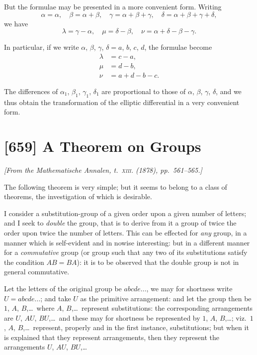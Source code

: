 \documentclass[11pt,a4paper]{article}
\theoremstyle{plain}
\theoremstyle{definition}
\begin{document}
But the formulae may be presented in a more convenient form. Writing
\[
\alpha = \alpha, \quad \beta = \alpha + \beta, \quad \gamma = \alpha + \beta + \gamma, \quad \delta = \alpha + \beta + \gamma + \delta,
\]
we have
\[
\lambda = \gamma - \alpha, \quad \mu = \delta - \beta, \quad \nu = \alpha + \delta - \beta - \gamma.
\]

In particular, if we write $\alpha$, $\beta$, $\gamma$, $\delta = a$, $b$, $c$, $d$, the formulae become
\begin{align*}
\lambda &= c - a, \\
\mu &= d - b, \\
\nu &= a + d - b - c.
\end{align*}

The differences of $\alpha_1$, $\beta_1$, $\gamma_1$, $\delta_1$ are proportional to those of $\alpha$, $\beta$, $\gamma$, $\delta$, and we thus obtain the transformation of the elliptic differential in a very convenient form.

\newpage
\section{[659] A Theorem on Groups}
\label{sec:659}

\noindent\textit{[From the \emph{Mathematische Annalen}, t.~\textsc{xiii}. (1878), pp.~561--565.]}

\medskip

The following theorem is very simple; but it seems to belong to a class of theorems, the investigation of which is desirable.

I consider a substitution-group of a given order upon a given number of letters; and I seek to \emph{double} the group, that is to derive from it a group of twice the order upon twice the number of letters. This can be effected for \emph{any} group, in a manner which is self-evident and in nowise interesting: but in a different manner for a \emph{commutative} group (or group such that any two of its substitutions satisfy the condition $AB = BA$): it is to be observed that the double group is not in general commutative.

Let the letters of the original group be $abcde\ldots$, we may for shortness write $U = abcde\ldots$; and take $U$ as the primitive arrangement: and let the group then be $1$, $A$, $B$,\ldots\ where $A$, $B$,\ldots\ represent substitutions: the corresponding arrangements are $U$, $AU$, $BU$,\ldots\ and these may for shortness be represented by $1$, $A$, $B$,\ldots; viz.~$1$, $A$, $B$,\ldots\ represent, properly and in the first instance, substitutions; but when it is explained that they represent arrangements, then they represent the arrangements $U$, $AU$, $BU$,\ldots
\end{document}
